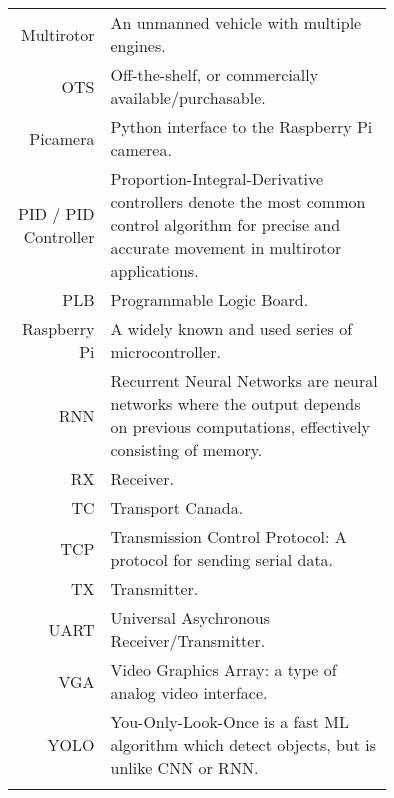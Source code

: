 \begin{tabular}[h]{rp{0.75\linewidth}}
    Multirotor & An unmanned vehicle with multiple engines. \\
    OTS & Off-the-shelf, or commercially available/purchasable. \\
    Picamera & Python interface to the Raspberry Pi camerea. \\
    PID / PID Controller & Proportion-Integral-Derivative controllers denote the most common control algorithm for precise and accurate movement in multirotor applications.\cite{pid}\\
    PLB & Programmable Logic Board. \\
    Raspberry Pi & A widely known and used series of microcontroller. \\
    RNN & Recurrent Neural Networks are neural networks where the output depends on previous computations, effectively consisting of memory.\cite{rnn}\\
    RX & Receiver.\\
    TC & Transport Canada.\\
    TCP & Transmission Control Protocol: A protocol for sending serial data. \\
    TX & Transmitter.\\\
    UART & Universal Asychronous Receiver/Transmitter. \\
    VGA & Video Graphics Array: a type of analog video interface. \\
    YOLO & You-Only-Look-Once is a fast ML algorithm which detect objects, but is unlike CNN or RNN.\cite{yolo}\cite{yolo-2}\\
     & \\

    \hline

\end{tabular}
